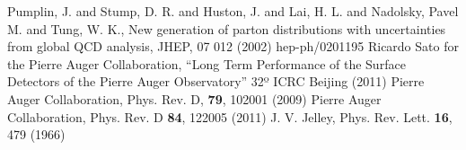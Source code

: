 \begin{thebibliography}{1}
 Pumplin, J. and Stump, D. R. and Huston, J. and Lai, H. L. and Nadolsky, Pavel M. and Tung, W. K., New generation of parton distributions with uncertainties from global QCD analysis, JHEP, 07 012 (2002) hep-ph/0201195
 Ricardo Sato for the Pierre Auger Collaboration, ``Long Term Performance of the Surface Detectors of the Pierre Auger Observatory'' 32º ICRC Beijing (2011)
 Pierre Auger Collaboration, Phys. Rev. D, \textbf{79}, 102001 (2009)
 Pierre Auger Collaboration, Phys. Rev. D \textbf{84}, 122005 (2011)
  J. V. Jelley, Phys. Rev. Lett. \textbf{16}, 479 (1966)

\end{thebibliography}
